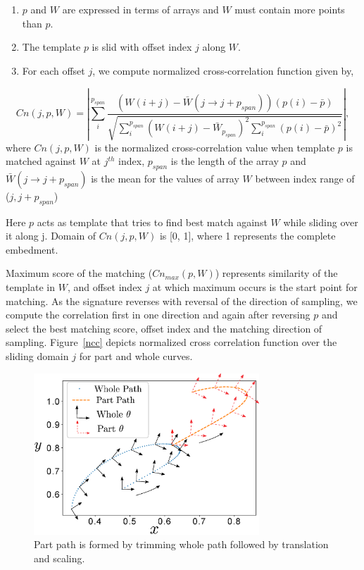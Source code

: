 \documentclass[twocolumn,10pt]{asme2e}
\begin{document}
\begin{enumerate}
  \item $p$ and $W$ are expressed in terms of arrays and $W$ must contain more points than $p$.
  \item The template $p$ is slid with offset index $j$ along $W$.
  \item For each offset $j$, we compute normalized cross-correlation function given by,
\end{enumerate}
\vspace{-0.6cm}
\begin{equation}\label{nccEq}
  Cn(j, p, W) = |\sum_{i}^{p_{span}} \frac{(W(i+j) - \bar{W}(j\to j + p_{span}))(p(i) - \bar{p})}{\sqrt{\sum_{i}^{p_{span}}{(W(i+j) - \bar{W}_{p_{span}})}^2\sum_{i}^{p_{span}}{(p(i) - \bar{p})}^2}} |,
\end{equation}
where $Cn(j, p, W)$ is the normalized cross-correlation value when template $p$ is matched against $W$ at $j^{th}$ index, $p_{span}$ is the length of the array $p$ and $\bar{W}(j\to j + p_{span})$ is the mean for the values of array $W$ between index range of ($j, j+p_{span}$)

Here $p$ acts as template that tries to find best match against $W$ while sliding over it along j.
Domain of $Cn(j, p, W)$ is [0, 1], where 1 represents the complete embedment.

Maximum score of the matching ($Cn_{max}(p, W)$) represents similarity of the template in $W$, and offset index $j$ at which maximum occurs is the start point for matching.
As the signature reverses with reversal of the direction of sampling, we compute the correlation first in one direction and again after reversing $p$ and select the best matching score, offset index and the matching direction of sampling.
Figure~\ref{ncc} depicts normalized cross correlation function over the sliding domain $j$ for part and whole curves.

\begin{figure}
\centering
\includegraphics[width=240pt]{figure/fig_whole_part.eps}
  \caption{Part path is formed by trimming whole path followed by translation and scaling.}
\label{wholePart}
\end{figure}
\end{document}
